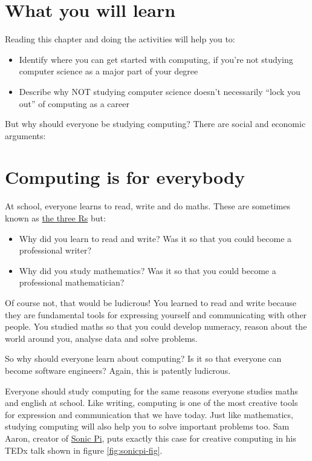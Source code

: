 \documentclass[
]{book}
\providecommand{\tightlist}{%
  \setlength{\itemsep}{0pt}\setlength{\parskip}{0pt}}
\begin{document}
\hypertarget{ilo6}{%
\section{What you will learn}\label{ilo6}}

Reading this chapter and doing the activities will help you to:

\begin{itemize}
\tightlist
\item
  Identify where you can get started with computing, if you're not studying computer science as a major part of your degree
\item
  Describe why NOT studying computer science doesn't necessarily ``lock you out'' of computing as a career
\end{itemize}

But why should everyone be studying computing? There are social and economic arguments:

\hypertarget{creative}{%
\section{Computing is for everybody}\label{creative}}

At school, everyone learns to read, write and do maths. These are sometimes known as \href{https://en.wikipedia.org/wiki/The_three_Rs}{the three Rs} but:

\begin{itemize}
\tightlist
\item
  Why did you learn to read and write? Was it so that you could become a professional writer?
\item
  Why did you study mathematics? Was it so that you could become a professional mathematician?
\end{itemize}

Of course not, that would be ludicrous! You learned to read and write because they are fundamental tools for expressing yourself and communicating with other people. You studied maths so that you could develop numeracy, reason about the world around you, analyse data and solve problems.

So why should everyone learn about computing? Is it so that everyone can become software engineers? Again, this is patently ludicrous.

Everyone should study computing for the same reasons everyone studies maths and english at school. Like writing, computing is one of the most creative tools for expression and communication that we have today. Just like mathematics, studying computing will also help you to solve important problems too. Sam Aaron, creator of \href{https://en.wikipedia.org/wiki/Sonic_Pi}{Sonic Pi}, puts exactly this case for creative computing in his TEDx talk \citep{youtube-sonicpi} shown in figure \ref{fig:sonicpi-fig}.
\end{document}

